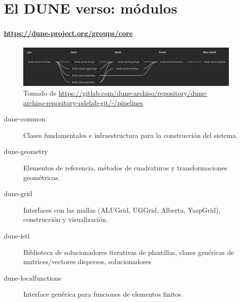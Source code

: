 \section{El DUNE verso: módulos}

\begin{frame}[fragile]
	\frametitle{\secname}
	\framesubtitle{\url{https://dune-project.org/groups/core}}

	\begin{figure}[ht!]
		\centering
		\includegraphics[width=14.6cm]{dependences}
		\caption{Tomado de \url{https://gitlab.com/dune-archiso/repository/dune-archiso-repository-pdelab-git/-/pipelines}}
	\end{figure}

	\begin{description}
		\item[dune-common]

			Clases fundamentales e infraestructura para la construcción del sistema.

		\item[dune-geometry]

			Elementos de referencia, métodos de cuadraturas y transformaciones geométricas.

		\item[dune-grid]

			Interfaces con las mallas (ALUGrid, UGGrid, Alberta, YaspGrid), construcción y visualización.

		\item[dune-istl]

			Biblioteca de solucionadores iterativas de plantillas, clases genéricas de matrices/vectores dispersos, solucionadores

		\item[dune-localfunctions]

			Interface genérica para funciones de elementos finitos.
	\end{description}

\end{frame}

